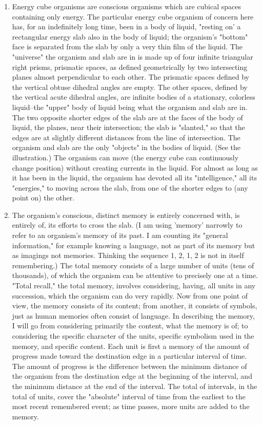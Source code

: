 \begin{enumerate}
\item Energy cube organisms are conscious organisms which are cubical 
spaces containing only energy. The particular energy cube organism of 
concern here has, for an indefinitely long time, been in a body of liquid, 
"resting on' a rectangular energy slab also in the body of liquid; the 
organism's "bottom" face is separated from the slab by only a very thin film 
of the liquid. The "universe" the organism and slab are in is made up of four 
infinite triangular right prisms, prismatic spaces, as defined geometrically by 
two intersecting planes almost perpendicular to each other. The prismatic 
spaces defined by the vertical obtuse dihedral angles are empty. The other 
spaces, defined by the vertical acute dihedral angles, are infinite bodies of a 
stationary, colorless liquid--the "upper" body of liquid being what the 
organism and slab are in. The two opposite shorter edges of the slab are at 
the faces of the body of liquid, the planes, near their intersection; the slab is 
"slanted," so that the edges are at slightly different distances from the line 
of intersection. The organism and slab are the only "objects" in the bodies 
of liquid. (See the illustration.) The organism can move (the energy cube can 
continuously change position) without creating currents in the liquid. For 
almost as long as it has been in the liquid, the organism has devoted all its 
"intelligence," all its "energies," to moving across the slab, from one of the 
shorter edges to (any point on) the other. 

\item The organism's conscious, distinct memory is entirely concerned 
with, is entirely of, its efforts to cross the slab. (I am using 'memory' 
narrowly to refer to an organism's memory of its past. I am counting its 
"general information," for example knowing a language, not as part of its 
memory but as imagings not memories. Thinking the sequence 1, 2, 1, 2 is 
not in itself remembering.) The total memory consists of a large number of 
units (tens of thousands), of which the organism can be attentive to precisely 
one at a time. "Total recall," the total memory, involves considering, having, 
all units in any succession, which the organism can do very rapidly. Now 
from one point of view, the memory consists of its content; from another, it 
consists of symbols, just as human memories often consist of language. In 
describing the memory, I will go from considering primarily the content, 
what the memory is of; to considering the specific character of the units, 
specific symbolism used in the memory, and specific content. Each unit is 
first a memory of the amount of progress made toward the destination edge 
in a particular interval of time. The amount of progress is the difference 
between the minimum distance of the organism from the destination edge at 
the beginning of the interval, and the minimum distance at the end of the 
interval. The total of intervals, in the total of units, cover the "absolute" 
interval of time from the earliest to the most recent remembered event; as 
time passes, more units are added to the memory. 


\end{enumerate}
